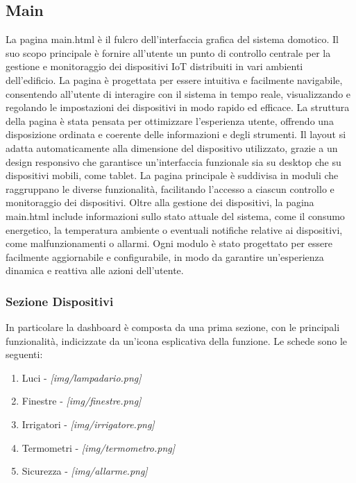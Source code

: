 \documentclass[italian, 12pt, a4paper]{article}
\begin{document}
\subsection{Main}
La pagina main.html è il fulcro dell'interfaccia grafica del sistema domotico. Il suo scopo principale è fornire all'utente un punto di controllo centrale per la gestione e monitoraggio dei dispositivi IoT distribuiti in vari ambienti dell’edificio. La pagina è progettata per essere intuitiva e facilmente navigabile, consentendo all'utente di interagire con il sistema in tempo reale, visualizzando e regolando le impostazioni dei dispositivi in modo rapido ed efficace. La struttura della pagina è stata pensata per ottimizzare l'esperienza utente, offrendo una disposizione ordinata e coerente delle informazioni e degli strumenti. Il layout si adatta automaticamente alla dimensione del dispositivo utilizzato, grazie a un design responsivo che garantisce un’interfaccia funzionale sia su desktop che su dispositivi mobili, come tablet. La pagina principale è suddivisa in moduli che raggruppano le diverse funzionalità, facilitando l'accesso a ciascun controllo e monitoraggio dei dispositivi.
Oltre alla gestione dei dispositivi, la pagina main.html include informazioni sullo stato attuale del sistema, come il consumo energetico, la temperatura ambiente o eventuali notifiche relative ai dispositivi, come malfunzionamenti o allarmi. Ogni modulo è stato progettato per essere facilmente aggiornabile e configurabile, in modo da garantire un'esperienza dinamica e reattiva alle azioni dell'utente.\\
\subsubsection{Sezione Dispositivi}
In particolare la dashboard è composta da una prima sezione, con le principali funzionalità, indicizzate da un'icona esplicativa della funzione. Le schede sono le seguenti: 
\begin{enumerate}
    \item Luci - \emph{[img/lampadario.png]}
    \item Finestre - \emph{[img/finestre.png]}
    \item Irrigatori - \emph{[img/irrigatore.png]}
    \item Termometri - \emph{[img/termometro.png]}
    \item Sicurezza - \emph{[img/allarme.png]}
\end{enumerate}
\end{document}
